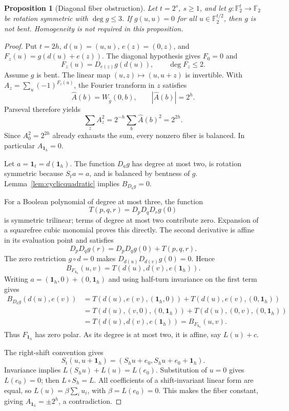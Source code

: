 \documentclass[11pt,a4paper]{article}
\newtheorem{proposition}[theorem]{Proposition}
\newcommand{\F}{\mathbb F_2}
\begin{document}
\begin{proposition}[Diagonal fiber obstruction]\label{prop:diagonalobstruction}
Let $t=2^s$, $s\ge1$, and let $g:\F^t\to\F$ be rotation symmetric with $\deg g\le3$. If $g(u,u)=0$ for all $u\in\F^{t/2}$, then $g$ is not bent. Homogeneity is not required in this proposition.
\end{proposition}
\begin{proof}
Put $t=2h$, $d(u)=(u,u)$, $e(z)=(0,z)$, and $F_z(u)=g(d(u)+e(z))$. The diagonal hypothesis gives $F_0=0$ and
\[
 F_z(u)=D_{e(z)}g(d(u)),\qquad \deg F_z\le2.
\]
Assume $g$ is bent. The linear map $(u,z)\mapsto(u,u+z)$ is invertible. With $A_z=\sum_u(-1)^{F_z(u)}$, the Fourier transform in $z$ satisfies
\[
 \widehat A(b)=W_{\widetilde g}(0,b),\qquad |\widehat A(b)|=2^h.
\]
Parseval therefore yields
\[
 \sum_z A_z^2=2^{-h}\sum_b\widehat A(b)^2=2^{2h}.
\]
Since $A_0^2=2^{2h}$ already exhausts the sum, every nonzero fiber is balanced. In particular $A_{\mathbf1_h}=0$.

Let $a=\mathbf1_t=d(\mathbf1_h)$. The function $D_ag$ has degree at most two, is rotation symmetric because $S_ta=a$, and is balanced by bentness of $g$. Lemma~\ref{lem:cyclicquadratic} implies $B_{D_ag}=0$.

For a Boolean polynomial of degree at most three, the function
\[
 T(p,q,r)=D_pD_qD_rg(0)
\]
is symmetric trilinear; terms of degree at most two contribute zero. Expansion of a squarefree cubic monomial proves this directly. The second derivative is affine in its evaluation point and satisfies
\[
 D_pD_qg(r)=D_pD_qg(0)+T(p,q,r).
\]
The zero restriction $g\circ d=0$ makes $D_{d(u)}D_{d(v)}g(0)=0$. Hence
\[
 B_{F_{\mathbf1_h}}(u,v)=T(d(u),d(v),e(\mathbf1_h)).
\]
Writing $a=(\mathbf1_h,0)+(0,\mathbf1_h)$ and using half-turn invariance on the first term gives
\begin{align*}
 B_{D_ag}(d(u),e(v))
 &=T(d(u),e(v),(\mathbf1_h,0))+T(d(u),e(v),(0,\mathbf1_h))\\
 &=T(d(u),(v,0),(0,\mathbf1_h))+T(d(u),(0,v),(0,\mathbf1_h))\\
 &=T(d(u),d(v),e(\mathbf1_h))=B_{F_{\mathbf1_h}}(u,v).
\end{align*}
Thus $F_{\mathbf1_h}$ has zero polar. As its degree is at most two, it is affine, say $L(u)+c$.

The right-shift convention gives
\[
 S_t(u,u+\mathbf1_h)=
 (S_hu+e_0,S_hu+e_0+\mathbf1_h).
\]
Invariance implies $L(S_hu)+L(u)=L(e_0)$. Substitution of $u=0$ gives $L(e_0)=0$; then $L\circ S_h=L$. All coefficients of a shift-invariant linear form are equal, so $L(u)=\beta\sum_i u_i$, with $\beta=L(e_0)=0$. This makes the fiber constant, giving $A_{\mathbf1_h}=\pm2^h$, a contradiction.
\end{proof}
\end{document}
